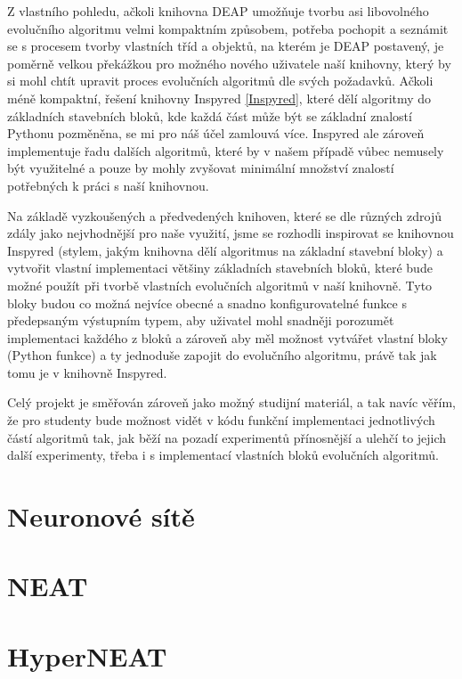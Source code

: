 Z vlastního pohledu, ačkoli knihovna DEAP umožňuje tvorbu asi
libovolného evolučního algoritmu velmi kompaktním způsobem, potřeba pochopit a
seznámit se s procesem tvorby vlastních tříd a objektů, na kterém je DEAP
postavený, je poměrně velkou překážkou pro možného nového uživatele naší
knihovny, který by si mohl chtít upravit proces evolučních algoritmů dle
svých požadavků. Ačkoli méně kompaktní, řešení knihovny Inspyred
\ref{Inspyred}, které dělí algoritmy do základních stavebních bloků, kde každá
část může být se základní znalostí Pythonu pozměněna, se mi pro náš účel
zamlouvá více. Inspyred ale zároveň implementuje řadu dalších algoritmů, které
by v našem případě vůbec nemusely být využitelné a pouze by mohly zvyšovat
minimální množství znalostí potřebných k práci s naší knihovnou.

Na základě vyzkoušených a předvedených knihoven, které se dle různých zdrojů
\citep{fortin2012deap} zdály jako nejvhodnější pro naše využití, jsme se
rozhodli inspirovat se knihovnou Inspyred (stylem, jakým knihovna dělí
algoritmus na základní stavební bloky) a vytvořit vlastní implementaci většiny
základních stavebních bloků, které bude možné použít při tvorbě vlastních
evolučních algoritmů v naší knihovně. Tyto bloky budou co možná nejvíce obecné
a snadno konfigurovatelné funkce s předepsaným výstupním typem, aby uživatel
mohl snadněji porozumět implementaci každého z bloků a zároveň aby měl možnost
vytvářet vlastní bloky (Python funkce) a ty jednoduše zapojit do evolučního
algoritmu, právě tak jak tomu je v knihovně Inspyred. 

Celý projekt je směřován zároveň jako možný studijní materiál, a tak navíc
věřím, že pro studenty bude možnost vidět v kódu funkční implementaci
jednotlivých částí algoritmů tak, jak běží na pozadí experimentů přínosnější a
ulehčí to jejich další experimenty, třeba i s implementací vlastních bloků
evolučních algoritmů.

\section{Neuronové sítě} \label{NN}
\section{NEAT} \label{NN - NEAT}
\section{HyperNEAT} \label{NN - HyperNEAT}

